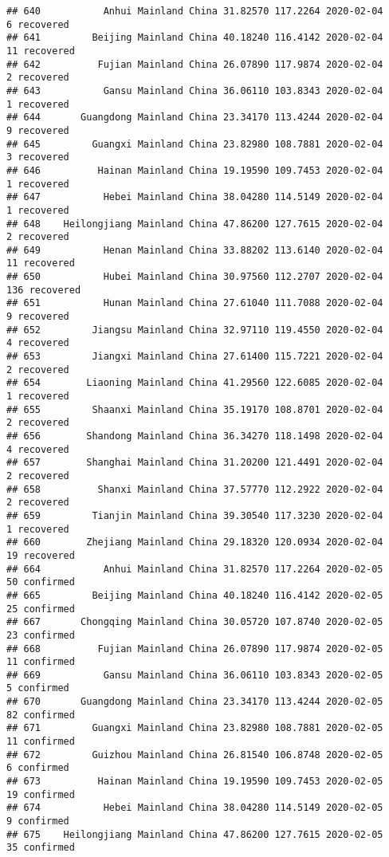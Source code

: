 \documentclass[
]{article}
\begin{document}
\begin{verbatim}
## 640           Anhui Mainland China 31.82570 117.2264 2020-02-04     6 recovered
## 641         Beijing Mainland China 40.18240 116.4142 2020-02-04    11 recovered
## 642          Fujian Mainland China 26.07890 117.9874 2020-02-04     2 recovered
## 643           Gansu Mainland China 36.06110 103.8343 2020-02-04     1 recovered
## 644       Guangdong Mainland China 23.34170 113.4244 2020-02-04     9 recovered
## 645         Guangxi Mainland China 23.82980 108.7881 2020-02-04     3 recovered
## 646          Hainan Mainland China 19.19590 109.7453 2020-02-04     1 recovered
## 647           Hebei Mainland China 38.04280 114.5149 2020-02-04     1 recovered
## 648    Heilongjiang Mainland China 47.86200 127.7615 2020-02-04     2 recovered
## 649           Henan Mainland China 33.88202 113.6140 2020-02-04    11 recovered
## 650           Hubei Mainland China 30.97560 112.2707 2020-02-04   136 recovered
## 651           Hunan Mainland China 27.61040 111.7088 2020-02-04     9 recovered
## 652         Jiangsu Mainland China 32.97110 119.4550 2020-02-04     4 recovered
## 653         Jiangxi Mainland China 27.61400 115.7221 2020-02-04     2 recovered
## 654        Liaoning Mainland China 41.29560 122.6085 2020-02-04     1 recovered
## 655         Shaanxi Mainland China 35.19170 108.8701 2020-02-04     2 recovered
## 656        Shandong Mainland China 36.34270 118.1498 2020-02-04     4 recovered
## 657        Shanghai Mainland China 31.20200 121.4491 2020-02-04     2 recovered
## 658          Shanxi Mainland China 37.57770 112.2922 2020-02-04     2 recovered
## 659         Tianjin Mainland China 39.30540 117.3230 2020-02-04     1 recovered
## 660        Zhejiang Mainland China 29.18320 120.0934 2020-02-04    19 recovered
## 664           Anhui Mainland China 31.82570 117.2264 2020-02-05    50 confirmed
## 665         Beijing Mainland China 40.18240 116.4142 2020-02-05    25 confirmed
## 667       Chongqing Mainland China 30.05720 107.8740 2020-02-05    23 confirmed
## 668          Fujian Mainland China 26.07890 117.9874 2020-02-05    11 confirmed
## 669           Gansu Mainland China 36.06110 103.8343 2020-02-05     5 confirmed
## 670       Guangdong Mainland China 23.34170 113.4244 2020-02-05    82 confirmed
## 671         Guangxi Mainland China 23.82980 108.7881 2020-02-05    11 confirmed
## 672         Guizhou Mainland China 26.81540 106.8748 2020-02-05     6 confirmed
## 673          Hainan Mainland China 19.19590 109.7453 2020-02-05    19 confirmed
## 674           Hebei Mainland China 38.04280 114.5149 2020-02-05     9 confirmed
## 675    Heilongjiang Mainland China 47.86200 127.7615 2020-02-05    35 confirmed

\end{verbatim}
\end{document}
